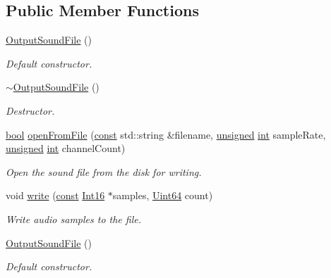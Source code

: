 \subsection*{Public Member Functions}
\begin{DoxyCompactItemize}
\item 
\hyperlink{classsf_1_1_output_sound_file_a7ae9f2dbd0991fa9394726a3d58bb19e}{Output\-Sound\-File} ()
\begin{DoxyCompactList}\small\item\em Default constructor. \end{DoxyCompactList}\item 
\hyperlink{classsf_1_1_output_sound_file_a1492adbfef1f391d720afb56f068182e}{$\sim$\-Output\-Sound\-File} ()
\begin{DoxyCompactList}\small\item\em Destructor. \end{DoxyCompactList}\item 
\hyperlink{term__entry_8h_a002004ba5d663f149f6c38064926abac}{bool} \hyperlink{classsf_1_1_output_sound_file_ae5e55f01c53c1422c44eaed2eed67fce}{open\-From\-File} (\hyperlink{term__entry_8h_a57bd63ce7f9a353488880e3de6692d5a}{const} std\-::string \&filename, \hyperlink{curses_8priv_8h_aca40206900cfc164654362fa8d4ad1e6}{unsigned} \hyperlink{term__entry_8h_ad65b480f8c8270356b45a9890f6499ae}{int} sample\-Rate, \hyperlink{curses_8priv_8h_aca40206900cfc164654362fa8d4ad1e6}{unsigned} \hyperlink{term__entry_8h_ad65b480f8c8270356b45a9890f6499ae}{int} channel\-Count)
\begin{DoxyCompactList}\small\item\em Open the sound file from the disk for writing. \end{DoxyCompactList}\item 
void \hyperlink{classsf_1_1_output_sound_file_adfcf525fced71121f336fa89faac3d67}{write} (\hyperlink{term__entry_8h_a57bd63ce7f9a353488880e3de6692d5a}{const} \hyperlink{namespacesf_a3c8e10435e2a310a7741755e66b5c94e}{Int16} $\ast$samples, \hyperlink{namespacesf_add9ac83466d96b9f50a009b9f4064266}{Uint64} count)
\begin{DoxyCompactList}\small\item\em Write audio samples to the file. \end{DoxyCompactList}\item 
\hyperlink{classsf_1_1_output_sound_file_a7ae9f2dbd0991fa9394726a3d58bb19e}{Output\-Sound\-File} ()
\begin{DoxyCompactList}\small\item\em Default constructor. \end{DoxyCompactList}\item 

\end{DoxyCompactItemize}
